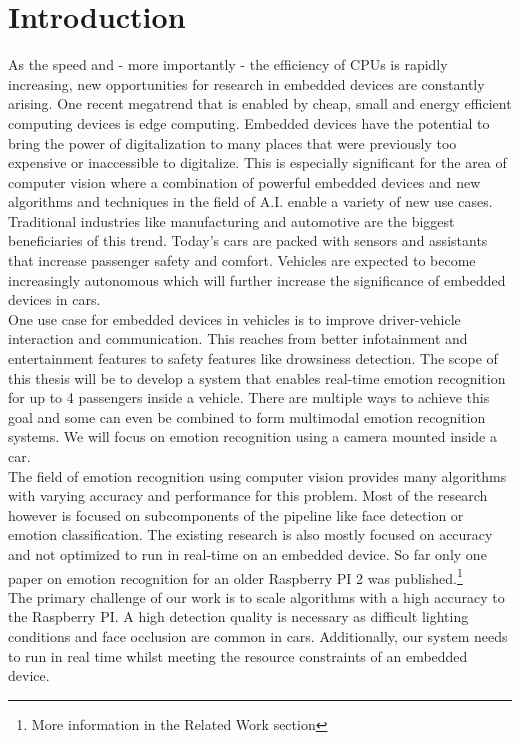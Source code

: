 \chapter{Introduction}
As the speed and - more importantly - the efficiency of CPUs is rapidly increasing, new opportunities for research in embedded devices are constantly arising. One recent megatrend that is enabled by cheap, small and energy efficient computing devices is edge computing. Embedded devices have the potential to bring the power of digitalization to many places that were previously too expensive or inaccessible to digitalize. This is especially significant for the area of computer vision where a combination of powerful embedded devices and new algorithms and techniques in the field of A.I. enable a variety of new use cases.\\
Traditional industries like manufacturing and automotive are the biggest beneficiaries of this trend. Today's cars are packed with sensors and assistants that increase passenger safety and comfort. Vehicles are expected to become increasingly autonomous which will further increase the significance of embedded devices in cars.\\
One use case for embedded devices in vehicles is to improve driver-vehicle interaction and communication. This reaches from better infotainment and entertainment features to safety features like drowsiness detection. The scope of this thesis will be to develop a system that enables real-time emotion recognition for up to 4 passengers inside a vehicle. There are multiple ways to achieve this goal and some can even be combined to form multimodal emotion recognition systems. We will focus on emotion recognition using a camera mounted inside a car.\\
The field of emotion recognition using computer vision provides many algorithms with varying accuracy and performance for this problem. Most of the research however is focused on subcomponents of the pipeline like face detection or emotion classification. The existing research is also mostly focused on accuracy and not optimized to run in real-time on an embedded device. So far only one paper on emotion recognition for an older Raspberry PI 2 was published.\footnote{More information in the Related Work section}\\
The primary challenge of our work is to scale algorithms with a high accuracy to the Raspberry PI. A high detection quality is necessary as difficult lighting conditions and face occlusion are common in cars. Additionally, our system needs to run in real time whilst meeting the resource constraints of an embedded device.\\
